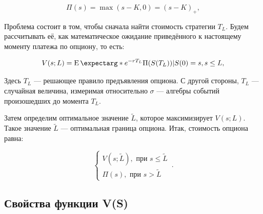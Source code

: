 \documentclass[a4paper,12pt]{article}
\theoremstyle{definition}
\newcommand{\expect}{\operatorname{E}\expectarg}
\begin{document}
\begin{equation}\label{eq:payoff_function}
\Pi(s) = \max(s - K, 0) = (s - K)_+,
\end{equation}

Проблема состоит в том, чтобы сначала найти стоимость стратегии $T_L$. Будем рассчитывать её, как математическое ожидание приведённого к настоящему моменту платежа по опциону, то есть:

\begin{equation}\label{eq:strategy_cost}
V(s; L) = \expect*{e^{-rT_L} \Pi(S(T_L)) | S(0) = s}, s \le L,
\end{equation}

Здесь $T_L$ --- решающее правило предъявления опциона. С другой стороны, $T_L$ --- случайная величина, измеримая относительно $\sigma$ --- алгебры событий произошедших до момента $T_L$.

Затем определим оптимальное значение $\widetilde{L}$, которое максимизирует $V(s; L)$. Такое значение $\widetilde{L}$ --- оптимальная граница опциона. Итак, стоимость опциона равна:

\begin{equation}\label{eq:option_price}
    \begin{cases}
      V(s; \widetilde{L}), \text{ при } s \le \widetilde{L}\\
      \Pi(s), \text{ при } s > \widetilde{L}
    \end{cases}\,.
\end{equation}

\subsection{Свойства функции V(S)}
\end{document}
